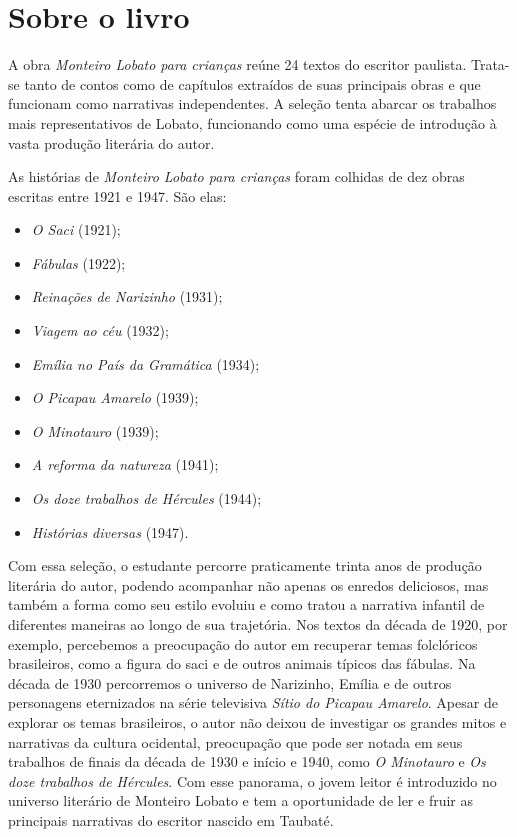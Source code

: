 \documentclass[11pt]{extarticle}
\begin{document}
\section{Sobre o livro}
A obra \textit{Monteiro Lobato para crianças} reúne 24 textos do escritor paulista.
Trata-se tanto de contos como de capítulos extraídos de suas principais obras e que funcionam como narrativas independentes. A seleção tenta abarcar os trabalhos mais representativos de Lobato, funcionando como uma espécie de introdução à vasta produção literária do autor.

As histórias de \textit{Monteiro Lobato para crianças} foram colhidas de dez obras escritas entre 1921 e 1947. São elas:

\begin{itemize}
\item\textit{O Saci} (1921);
\item\textit{Fábulas} (1922);
\item\textit{Reinações de Narizinho} (1931);
\item\textit{Viagem ao céu} (1932);
\item\textit{Emília no País da Gramática} (1934);
\item\textit{O Picapau Amarelo} (1939);
\item\textit{O Minotauro} (1939);
\item\textit{A reforma da natureza} (1941);
\item\textit{Os doze trabalhos de Hércules} (1944);
\item\textit{Histórias diversas} (1947).
\end{itemize}

Com essa seleção, o estudante percorre praticamente trinta anos de produção literária do autor, podendo acompanhar não apenas os enredos deliciosos, mas também a forma como seu estilo evoluiu e como tratou a narrativa infantil de diferentes maneiras ao longo de sua trajetória. Nos textos da década de 1920, por exemplo, percebemos a preocupação do autor em recuperar temas folclóricos brasileiros, como a figura do saci e de outros animais típicos das fábulas. Na década de 1930 percorremos o universo de Narizinho, Emília e de outros personagens eternizados na série televisiva \textit{Sítio do Picapau Amarelo}.
Apesar de explorar os temas brasileiros, o autor não deixou de investigar os grandes mitos e narrativas da cultura ocidental, preocupação que pode ser notada em seus trabalhos de finais da década de 1930 e início e 1940, como \textit{O Minotauro} e \textit{Os doze trabalhos de Hércules}. Com esse panorama, o jovem leitor é introduzido no universo literário de Monteiro Lobato e tem a oportunidade de ler e fruir as principais narrativas do escritor nascido em Taubaté.
\end{document}
